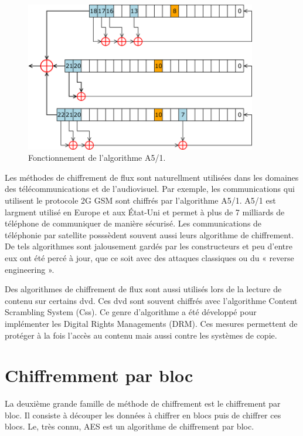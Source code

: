 	\begin{figure}[!h]
		\centering
		\includegraphics[width=0.9\textwidth]{imgs/application/A5.png}
		\caption{Fonctionnement de l'algorithme A5/1.}
		\label{algoA5}
	\end{figure}

	Les méthodes de chiffrement de flux sont naturellment utilisées dans les domaines des télécommunications et de l'audiovisuel.
	Par exemple, les communications qui utilisent le protocole 2G GSM sont chiffrés par l'algorithme A5/1.
	A5/1 est largment utilisé en Europe et aux État-Uni et permet à plus de 7 milliards de téléphone de communiquer de manière sécurisé\cite{7milliards}.
	Les communications de téléphonie par satellite posssèdent souvent aussi leurs algorithme de chiffrement.
	De tels algorithmes sont jalousement gardés par les constructeurs et peu d'entre eux ont été percé à jour, que ce soit avec des attaques classiques ou du « reverse engineering ».

	Des algorithmes de chiffrement de flux sont aussi utilisés lors de la lecture de contenu sur certains dvd. Ces dvd sont souvent chiffrés avec l'algorithme Content Scrambling System (Css).
	Ce genre d'algorithme a été développé pour implémenter les Digital Rights Managements (DRM). Ces mesures permettent de protéger à la fois l'accès au contenu mais aussi contre les systèmes de copie.

	\section{Chiffremment par bloc}

	La deuxième grande famille de méthode de chiffrement est le chiffrement par bloc. Il consiste à découper les données à chiffrer en blocs puis de chiffrer ces blocs.
	Le, très connu, AES est un algorithme de chiffrement par bloc.

